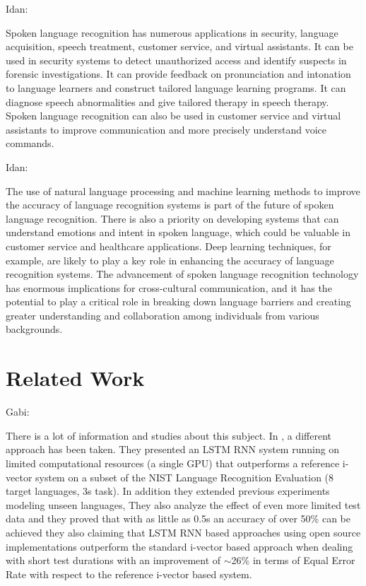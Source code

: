 \documentclass[a4paper]{article}
\begin{document}
Idan:

Spoken language recognition has numerous applications in security, language acquisition, speech treatment, customer service, and virtual assistants. It can be used in security systems to detect unauthorized access and identify suspects in forensic investigations. It can provide feedback on pronunciation and intonation to language learners and construct tailored language learning programs. It can diagnose speech abnormalities and give tailored therapy in speech therapy. Spoken language recognition can also be used in customer service and virtual assistants to improve communication and more precisely understand voice commands.

Idan:

The use of natural language processing and machine learning methods to improve the accuracy of language recognition systems is part of the future of spoken language recognition. There is also a priority on developing systems that can understand emotions and intent in spoken language, which could be valuable in customer service and healthcare applications. Deep learning techniques, for example, are likely to play a key role in enhancing the accuracy of language recognition systems. The advancement of spoken language recognition technology has enormous implications for cross-cultural communication, and it has the potential to play a critical role in breaking down language barriers and creating greater understanding and collaboration among individuals from various backgrounds.



\section{Related Work}
Gabi:

There is a lot of information and studies about this subject.
In \cite{zazo2016language}, a different approach has been taken.
They presented an LSTM RNN system running on limited computational resources (a single GPU) that outperforms a reference i-vector system on a subset of the NIST Language Recognition Evaluation (8 target languages, 3s task). In addition they extended previous
experiments modeling unseen languages, They also analyze the effect of even more limited test data and they proved that with as little as 0.5s an accuracy of over 50\% can be achieved they also claiming that LSTM RNN based
approaches using open source implementations outperform the standard i-vector based approach when dealing with short test durations with an improvement of $\sim$26\% in terms of
Equal Error Rate with respect to the reference i-vector based system.
\end{document}
